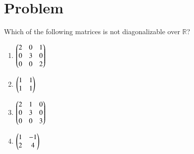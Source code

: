 \documentclass[journal,12pt]{IEEEtran}
\begin{document}
\section{\textbf{Problem}}
Which of the following matrices is not diagonalizable over $\mathbb{R}$?
\begin{enumerate}
\item $\begin{pmatrix}2&0&1\\0&3&0\\0&0&2\end{pmatrix}$\\ 
\item $\begin{pmatrix}1&1\\1&1\end{pmatrix}$\\ 
\item $\begin{pmatrix}2&1&0\\0&3&0\\0&0&3\end{pmatrix}$\\ 
\item $\begin{pmatrix}1&-1\\2&4\end{pmatrix}$
\end{enumerate}
\end{document}
